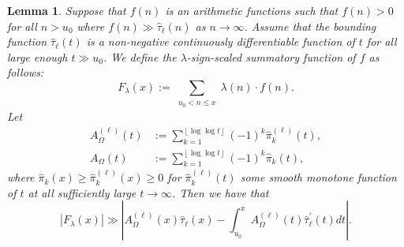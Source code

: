 \documentclass[11pt,reqno,a4letter]{article}
\numberwithin{figure}{section}
\numberwithin{table}{section}
\newcommand{\floor}[1]{\left\lfloor #1 \right\rfloor}
\theoremstyle{plain}
\newtheorem{lemma}[theorem]{Lemma}
\numberwithin{theorem}{section}
\theoremstyle{definition}
\newcommand{\SuccSim}[0]{\overset{_{\scriptsize{\blacktriangle}}}{\succsim}}
\renewcommand{\SuccSim}[0]{\ensuremath{\gg}}
\begin{document}
\begin{lemma} 
\label{lemma_CLT_and_AbelSummation} 
Suppose that $f(n)$ is an arithmetic functions 
such that $f(n) > 0$ for all $n > u_0$ where 
$f(n) \SuccSim \widehat{\tau}_{\ell}(n)$ as $n \rightarrow \infty$. Assume that 
the bounding function $\widehat{\tau}_{\ell}(t)$ is a non-negative 
continuously differentiable function of $t$ for all 
large enough $t \gg u_0$.  
We define the $\lambda$-sign-scaled summatory function of $f$ as follows: 
\[
F_{\lambda}(x) := \sum_{\substack{u_0 < n \leq x}} \lambda(n) \cdot f(n). 
\]
Let 
\begin{align*} 
A_{\Omega}^{(\ell)}(t) & := \sum_{k=1}^{\floor{\log\log t}} (-1)^k \widehat{\pi}_k^{(\ell)}(t), \\ 
A_{\Omega}(t) & := \sum_{k=1}^{\floor{\log\log t}} (-1)^k \widehat{\pi}_k(t), 
\end{align*} 
where $\widehat{\pi}_k(x) \geq \widehat{\pi}_k^{(\ell)}(x) \geq 0$ for 
$\widehat{\pi}_k^{(\ell)}(t)$ some smooth monotone 
function of $t$ at all sufficiently large $t \rightarrow \infty$. 
Then we have that 
\begin{equation} 
\label{eqn_Flambdax_RHA_AbelSummationFormula_v1} 
|F_{\lambda}(x)| \SuccSim \left\lvert 
     A_{\Omega}^{(\ell)}(x) \widehat{\tau}_{\ell}(x) - 
     \int_{u_0}^{x} A_{\Omega}^{(\ell)}(t) \widehat{\tau}_{\ell}^{\prime}(t) dt 
     \right\rvert.  
\end{equation} 
\end{lemma}
\end{document}
